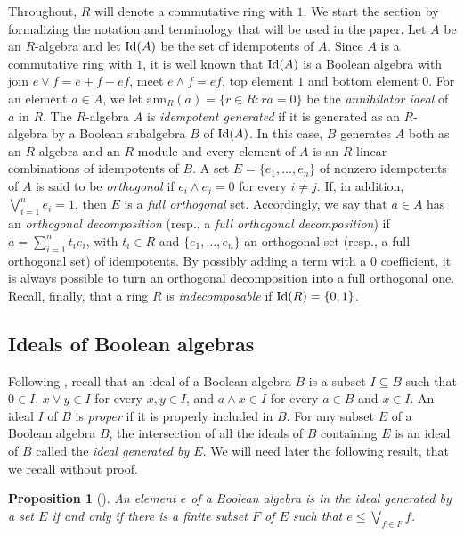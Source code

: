 \documentclass[11pt]{amsart}
\newtheorem{proposition}[theorem]{Proposition}
\theoremstyle{definition}
\def\ann{\mathrm{ann}}
\def\Id{\mbox{\rm Id}}
\begin{document}
Throughout, $R$ will denote a commutative ring with $1$. We start the section by formalizing the notation and terminology that will be used in the paper.
Let $A$ be an $R$-algebra and let $\Id(A)$ be the set of idempotents of $A$. Since $A$ is a commutative ring with $1$, it is well known that $\Id(A)$ is a Boolean algebra with join $e \vee f = e + f -ef$, meet $e \wedge f = ef$, top element $1$ and bottom element $0$. For an element $a\in A$, we let $\ann_{R}(a)=\{r\in R : ra=0\}$ be the {\it annihilator ideal} of $a$ in $R$. The $R$-algebra $A$ is {\it idempotent generated} if it is generated as an $R$-algebra by a Boolean subalgebra $B$ of $\Id(A)$. In this case, $B$ generates $A$ both as an $R$-algebra and an $R$-module and every element of $A$ is an $R$-linear combinations of idempotents of $B$. A set $E=\{e_1, \dots, e_n\}$ of nonzero idempotents of $A$ is said to be {\it orthogonal} if $e_i\wedge e_j=0$ for every $i\ne j$. If, in addition, $\bigvee_{i=1}^n e_i=1$, then $E$ is a {\it full orthogonal} set. Accordingly, we say that $a\in A$ has an {\it orthogonal decomposition} (resp., a {\it full orthogonal decomposition}) if $a=\sum_{i=1}^n t_ie_i$, with $t_i\in R$ and $\{e_1, \dots, e_n\}$ an orthogonal set (resp., a full orthogonal set) of idempotents. By possibly adding a term with a $0$ coefficient, it is always possible to turn an orthogonal decomposition into a full orthogonal one. Recall, finally, that a ring $R$ is {\it indecomposable} if $\Id(R)=\{0,1\}$.

\subsection{Ideals of Boolean algebras}\label{subsect: ideals of Boolean algebras}  Following \cite[Chapter~18]{GiHa09}, recall that an ideal of a Boolean algebra $B$ is a subset $I\subseteq B$ such that $0\in I$, $x\vee y\in I$ for every $x,y\in I$, and $a\wedge x\in I$ for every $a\in B$ and $x\in I$. An ideal $I$ of $B$ is {\it proper} if it is properly included in $B$. For any subset $E$ of a Boolean algebra $B$, the intersection of all the ideals of $B$ containing $E$ is an ideal of $B$ called the {\it ideal generated by $E$}. We will need later the following result, that we recall without proof.

\begin{proposition}[{\cite[Theorem 11, p.~155]{GiHa09}}]\label{prop: generated ideals}
An element $e$ of a Boolean algebra is in the ideal generated by a set $E$ if and only if there is a finite subset $F$ of $E$ such that $e \le \bigvee_{f\in F} f$.
\end{proposition}
\end{document}
